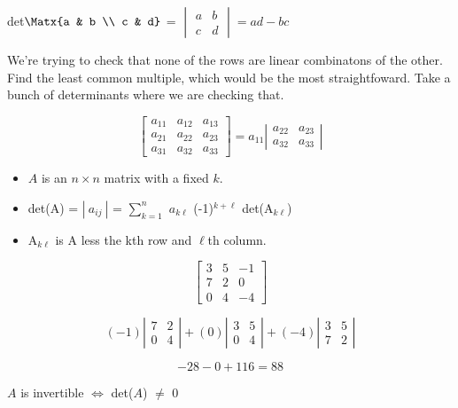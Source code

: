 

det$\Matx{a & b \\ c & d}$ = $\begin{vmatrix}a & b \\ c & d\end{vmatrix} = ad - bc$

We're trying to check that none of the rows are linear combinatons of the other. Find the least common multiple, which would be the most straightfoward. Take a bunch of determinants where we are checking that.
\begin{example}
\[ \left[ \begin{array}{lll} a_{11} & a_{12} & a_{13} \\
					  a_{21} & a_{22} & a_{23} \\
					  a_{31} & a_{32} & a_{33} 
	\end{array} \right] = a_{11} \left| \begin{array}{ll} a_{22} & a_{23} \\
								  a_{32} & a_{33} 
					\end{array}\right| \]

\end{example}
\begin{definition}

\begin{itemize}
	\item $A$ is an $n\times n$ matrix with a fixed $k$.
	\item det(A) = $|\ a_{ij}\ |$ = $\displaystyle \sum^n_{k=1}$ $a_{k\ell}$ (-1)$^{k+\ell}$ det(A$_{k\ell}$)
	\item A$_{k\ell}$ is A less the kth row and $\ell$th column.
\end{itemize}
\end{definition}


\begin{example}
\[ \left[ \begin{array}{rrr} 3 & 5 & -1 \\ 7 & 2 & 0 \\ 0 & 4 & -4 \end{array} \right] \]

\[ (-1) \left| \begin{array}{ll} 7 & 2 \\ 0 & 4 \end{array} \right| + (0) \left| \begin{array}{ll} 3 & 5 \\ 0 & 4 \end{array} \right| + (-4) \left| \begin{array}{ll} 3 & 5 \\ 7 & 2 \end{array} \right| \]

\[ -28 - 0 + 116 = 88 \]

$A$ is invertible $\iff$ det($A$) $\neq$ 0
\end{example}

